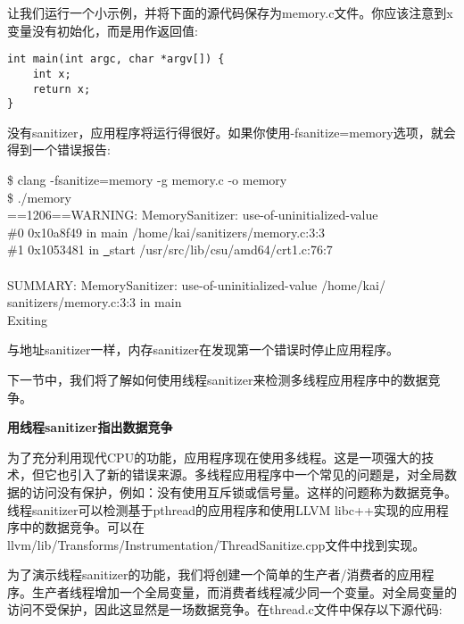 让我们运行一个小示例，并将下面的源代码保存为memory.c文件。你应该注意到x变量没有初始化，而是用作返回值:\par

\begin{lstlisting}[caption={}]
int main(int argc, char *argv[]) {
	int x;
	return x;
}
\end{lstlisting}

没有sanitizer，应用程序将运行得很好。如果你使用-fsanitize=memory选项，就会得到一个错误报告:\par

\begin{tcolorbox}[colback=white,colframe=black]
\$ clang -fsanitize=memory -g memory.c -o memory \\
\$ ./memory \\
==1206==WARNING: MemorySanitizer: use-of-uninitialized-value \\
\hspace*{1cm}\#0 0x10a8f49 in main /home/kai/sanitizers/memory.c:3:3 \\
\hspace*{1cm}\#1 0x1053481 in \underline{~}start /usr/src/lib/csu/amd64/crt1.c:76:7 \\
\\
SUMMARY: MemorySanitizer: use-of-uninitialized-value /home/kai/ \\
sanitizers/memory.c:3:3 in main \\
Exiting
\end{tcolorbox}

与地址sanitizer一样，内存sanitizer在发现第一个错误时停止应用程序。\par

下一节中，我们将了解如何使用线程sanitizer来检测多线程应用程序中的数据竞争。\par

\hspace*{\fill} \par %
\textbf{用线程sanitizer指出数据竞争}

为了充分利用现代CPU的功能，应用程序现在使用多线程。这是一项强大的技术，但它也引入了新的错误来源。多线程应用程序中一个常见的问题是，对全局数据的访问没有保护，例如：没有使用互斥锁或信号量。这样的问题称为数据竞争。线程sanitizer可以检测基于pthread的应用程序和使用LLVM libc++实现的应用程序中的数据竞争。可以在llvm/lib/Transforms/Instrumentation/\allowbreak ThreadSanitize.cpp文件中找到实现。\par

为了演示线程sanitizer的功能，我们将创建一个简单的生产者/消费者的应用程序。生产者线程增加一个全局变量，而消费者线程减少同一个变量。对全局变量的访问不受保护，因此这显然是一场数据竞争。在thread.c文件中保存以下源代码:\par

